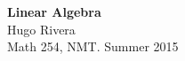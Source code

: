 \documentclass[letterpaper,9pt]{article}
\begin{document}
\begin{center} {\Large
    {\bf Linear Algebra}
\\  Hugo Rivera}
\\  Math 254, NMT. Summer 2015
\end{center}

\dosecttoc
\setlength{\mtcindent}{5pt}
\begin{multicols}{2}

\tableofcontents
\listoftheorems[ignoreall,show={theorem}]
\end{multicols}







\end{document}
